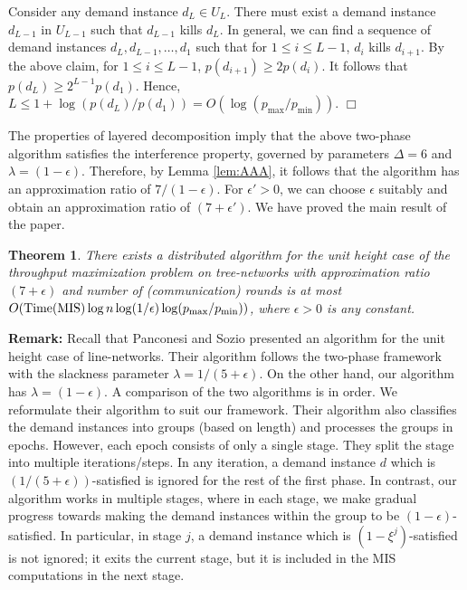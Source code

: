 \documentclass[11pt]{article}
\newtheorem{theorem}{\bf Theorem}[section]
\newcommand{\qed} {\hfill$\Box$}
\newcommand{\TMIS} {{\rm Time(MIS)}}
\begin{document}
Consider any demand instance $d_L\in U_L$. There must exist a demand instance $d_{L-1}$ in $U_{L-1}$
such that $d_{L-1}$ kills $d_L$. In general, we can find a sequence of demand instances
$d_L, d_{L-1}, \ldots, d_1$ such that for $1\leq i\leq L-1$, $d_i$ kills $d_{i+1}$.
By the above claim, for $1\leq i\leq L-1$, $p(d_{i+1})\geq 2p(d_i)$.
It follows that $p(d_L)\geq 2^{L-1} p(d_1)$. 
Hence, $L \leq 1 + \log(p(d_L)/p(d_1)) = O(\log(p_{\max}/p_{\min}))$.
\qed

The properties of layered decomposition imply that the above two-phase algorithm satisfies the interference
property, governed by parameters $\Delta=6$ and $\lambda=(1-\epsilon)$.
Therefore, by Lemma \ref{lem:AAA}, it follows that the algorithm has an approximation ratio of $7/(1-\epsilon)$.
For $\epsilon'>0$, we can choose $\epsilon$ suitably and obtain an approximation ratio of $(7+\epsilon')$.
We have proved the main result of the paper.

\begin{theorem}
\label{thm:main}
There exists a distributed algorithm for the unit height case of the throughput maximization problem on tree-networks 
with approximation ratio $(7+\epsilon)$ and number of (communication) rounds is at most 
$O(\TMIS \log n \log(1/\epsilon) \log(p_{\max}/p_{\min}))$,
where $\epsilon>0$ is any constant.
\end{theorem}

\noindent
{\bf Remark: }Recall that Panconesi and Sozio \cite{Pancc} presented an algorithm for the unit height case of
line-networks. Their algorithm follows the two-phase framework with the slackness parameter $\lambda=1/(5+\epsilon)$.
On the other hand, our algorithm has $\lambda = (1-\epsilon)$.
A comparison of the two algorithms is in order. We reformulate their algorithm to suit our framework.
Their algorithm also classifies the demand instances into groups 
(based on length) and processes the groups in epochs. However, 
each epoch consists of only a single stage. They split the stage into multiple iterations/steps.
In any iteration, a demand instance $d$ which is $(1/(5+\epsilon))$-satisfied is ignored
for the rest of the first phase. In contrast, our algorithm works in multiple stages,
where in each stage, we make gradual progress towards making the demand instances
within the group to be $(1-\epsilon)$-satisfied. In particular,
in stage $j$, a demand instance which is $(1-\xi^j)$-satisfied is not ignored;
it exits the current stage, but it is included in the MIS computations in the next stage.
\\
\end{document}
